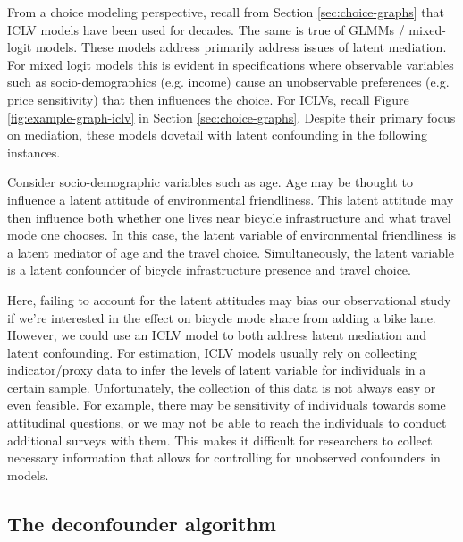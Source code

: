 From a choice modeling perspective, recall from Section \ref{sec:choice-graphs} that ICLV models have been used for decades.
The same is true of GLMMs / mixed-logit models.
These models address primarily address issues of latent mediation.
For mixed logit models this is evident in specifications where observable variables such as socio-demographics (e.g. income) cause an unobservable preferences (e.g. price sensitivity) that then influences the choice.
For ICLVs, recall Figure \ref{fig:example-graph-iclv} in Section \ref{sec:choice-graphs}.
Despite their primary focus on mediation, these models dovetail with latent confounding in the following instances.

Consider socio-demographic variables such as age.
Age may be thought to influence a latent attitude of environmental friendliness.
This latent attitude may then influence both whether one lives near bicycle infrastructure and what travel mode one chooses.
In this case, the latent variable of environmental friendliness is a latent mediator of age and the travel choice.
Simultaneously, the latent variable is a latent confounder of bicycle infrastructure presence and travel choice.

Here, failing to account for the latent attitudes may bias our observational study
if we're interested in the effect on bicycle mode share from adding a bike lane.
However, we could use an ICLV model to both address latent mediation and latent confounding.
For estimation, ICLV models usually rely on collecting indicator/proxy data to infer the levels of latent variable for individuals in a certain sample.
Unfortunately, the collection of this data is not always easy or even feasible.
For example, there may be sensitivity of individuals towards some attitudinal questions, or we may not be able to reach the individuals to conduct additional surveys with them.
This makes it difficult for researchers to collect necessary information that allows for controlling for unobserved confounders in models.

\subsection{The deconfounder algorithm}
\label{sec:deconfounder-algo}

